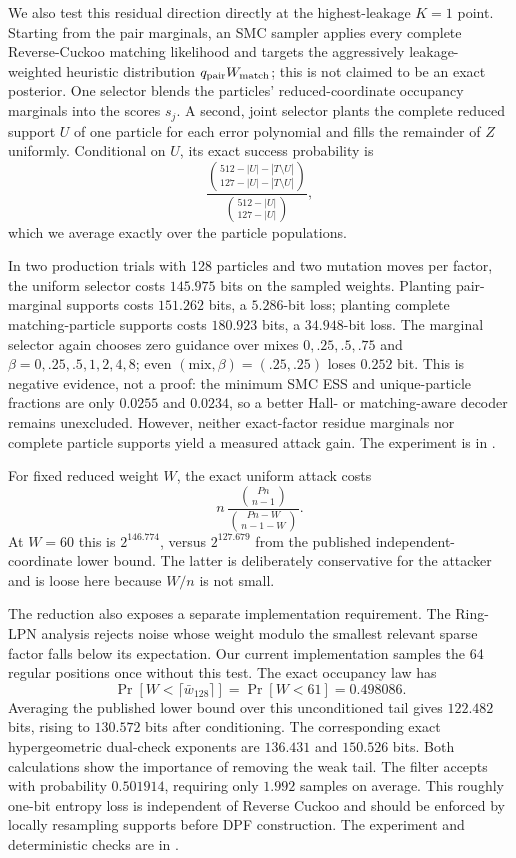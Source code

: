 We also test this residual direction directly at the highest-leakage $K=1$
point.  Starting from the pair marginals, an SMC sampler applies every complete
Reverse-Cuckoo matching likelihood and targets the aggressively
leakage-weighted heuristic distribution $q_{\rm pair}W_{\rm match}$; this is
not claimed to be an exact posterior.  One selector
blends the particles' reduced-coordinate occupancy marginals into the scores
$s_j$.  A second, joint selector plants the complete reduced support $U$ of
one particle for each error polynomial and fills the remainder of $Z$
uniformly.  Conditional on $U$, its exact success probability is
\[
 \frac{\binom{512-|U|-|T\setminus U|}
                   {127-|U|-|T\setminus U|}}
      {\binom{512-|U|}{127-|U|}},
\]
which we average exactly over the particle populations.

In two production trials with 128 particles and two mutation moves per factor,
the uniform selector costs $145.975$ bits on the sampled weights.  Planting
pair-marginal supports costs $151.262$ bits, a $5.286$-bit loss; planting
complete matching-particle supports costs $180.923$ bits, a $34.948$-bit
loss.  The marginal selector again chooses zero guidance over mixes
$0,.25,.5,.75$ and $\beta=0,.25,.5,1,2,4,8$; even
$(\mathrm{mix},\beta)=(.25,.25)$ loses $0.252$ bit.  This is negative evidence,
not a proof: the minimum SMC ESS and unique-particle fractions are only
$0.0255$ and $0.0234$, so a better Hall- or matching-aware decoder remains
unexcluded.  However, neither exact-factor residue marginals nor complete
particle supports yield a measured attack gain.  The experiment is in
.

For fixed reduced weight $W$, the exact uniform attack costs
\[
 n\,\frac{\binom{Pn}{n-1}}{\binom{Pn-W}{n-1-W}}.
\]
At $W=60$ this is $2^{146.774}$, versus $2^{127.679}$ from the published
independent-coordinate lower bound.  The latter is deliberately conservative
for the attacker and is loose here because $W/n$ is not small.

The reduction also exposes a separate implementation requirement.  The
Ring-LPN analysis rejects noise whose weight modulo the smallest relevant
sparse factor falls below its expectation.  Our current implementation samples
the 64 regular positions once without this test.  The exact occupancy law has
\[
 \Pr[W<\lceil\bar w_{128}\rceil]=\Pr[W<61]=0.498086.
\]
Averaging the published lower bound over this unconditioned tail gives
$122.482$ bits, rising to $130.572$ bits after conditioning.  The corresponding
exact hypergeometric dual-check exponents are $136.431$ and $150.526$ bits.
Both calculations show the importance of removing the weak tail.  The filter
accepts with probability $0.501914$, requiring only $1.992$ samples on average.
This roughly one-bit entropy loss is independent of Reverse Cuckoo and should
be enforced by locally resampling supports before DPF construction.  The
experiment and deterministic checks are in
.

